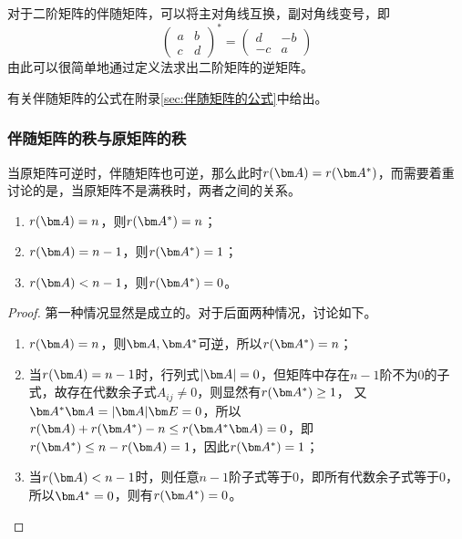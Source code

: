 对于二阶矩阵的伴随矩阵，可以将主对角线互换，副对角线变号，即
\begin{equation}
    \begin{pmatrix}
        a & b \\
        c & d
    \end{pmatrix}^*
    =
    \begin{pmatrix}
        d  & -b \\
        -c & a
    \end{pmatrix}
\end{equation}
由此可以很简单地通过定义法求出二阶矩阵的逆矩阵。

有关伴随矩阵的公式在附录\ref{sec:伴随矩阵的公式}中给出。
\subsubsection{伴随矩阵的秩与原矩阵的秩}
当原矩阵可逆时，伴随矩阵也可逆，那么此时$r(\mat{A})=r(\mat{A}^*)$，而需要着重讨论的是，当原矩阵不是满秩时，两者之间的关系。

\begin{enumerate}[(1)]
    \item $r(\mat{A})=n$，则$r(\mat{A}^*)=n$；
    \item $r(\mat{A})=n-1$，则$r(\mat{A}^*)=1$；
    \item $r(\mat{A})<n-1$，则$r(\mat{A}^*)=0$。
\end{enumerate}
\begin{proof}
    第一种情况显然是成立的。对于后面两种情况，讨论如下。
    \begin{enumerate}[(1)]
        \item $r(\mat{A})=n$，则$\mat{A},\mat{A}^*$可逆，所以$r(\mat{A}^*)=n$；
        \item 当$r(\mat{A})=n-1$时，行列式$|\mat{A}|=0$，但矩阵中存在$n-1$阶不为$0$的子式，故存在代数余子式$A_{ij}\neq 0$，则显然有$r(\mat{A}^*)\geq 1$，
              又$\mat{A}^*\mat{A} = |\mat{A}|\mat{E} = 0$，所以$r(\mat{A})+r(\mat{A}^*)-n\leq r(\mat{A}^*\mat{A}) = 0$，即$r(\mat{A}^*)\leq n - r(\mat{A}) = 1$，因此$r(\mat{A}^*)=1$；
        \item 当$r(\mat{A})<n-1$时，则任意$n-1$阶子式等于$0$，即所有代数余子式等于$0$，所以$\mat{A}^*=0$，则有$r(\mat{A}^*)=0$。
    \end{enumerate}
\end{proof}

